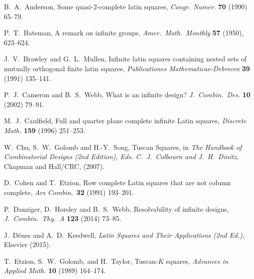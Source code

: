 \documentclass[12pt,a4paper]{article}
\begin{document}
\begin{thebibliography}{99}


B.~A.~Anderson, Some quasi-2-complete latin squares, {\em Congr. Numer.} {\bf 70} (1990) 65--79.







P.~T.~Bateman, A remark on infinite groups, {\em Amer.~Math.~Monthly} {\bf 57} (1950), 623--624.

J.~V.~Brawley and G.~L.~Mullen, Infinite latin squares containing nested sets of mutually orthogonal finite latin squares, {\em Publicationes Mathematicae-Debrecen} {\bf 39} (1991) 135--141.


P.~J.~Cameron and B.~S.~Webb, What is an infinite design? {\em J.~Combin.~Des.} {\bf 10} (2002) 79--91.

M.~J.~Caulfield, Full and quarter plane complete infinite Latin squares, {\em Discrete Math.} {\bf 159} (1996) 251--253.

W.~Chu, S.~W.~Golomb and H.-Y.~Song, Tuscan Squares, in {\em The Handbook of Combinatorial Designs (2nd Edition), Eds. C.~J.~Colbourn and J.~H.~Dinitz}, Chapman and Hall/CRC, (2007).

D.~Cohen and T.~Etzion, Row complete Latin squares that are not column complete, {\em Ars Combin.}~{\bf 32} (1991) 193--201.

P.~Danziger, D.~Horsley and B.~S.~Webb, Resolvability of infinite designs, {\em J.~Combin.~Thy.~A} {\bf 123} (2014) 73--85.

J.~D{\'e}nes and A.~D.~Keedwell, {\em Latin Squares and Their Applications (2nd Ed.)}, Elsevier (2015).

T.~Etzion, S.~W.~Golomb, and H.~Taylor, Tuscan-$K$ squares, {\em Advances in Applied Math.} {\bf 10} (1989) 164--174.


\end{thebibliography}
\end{document}
